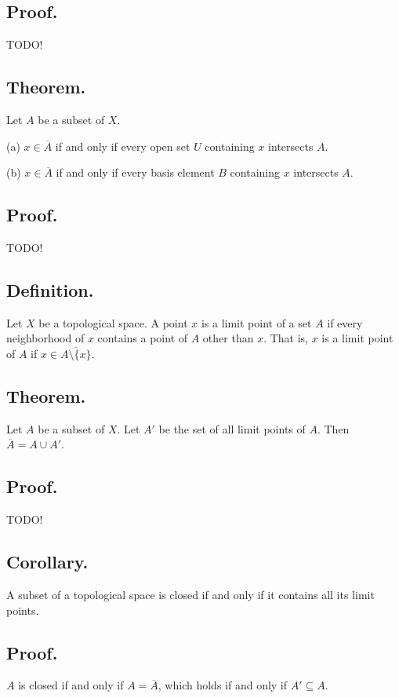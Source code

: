 \documentclass[titlepage]{article}
\begin{document}
\subsection{Proof.} TODO!

\subsection{Theorem.} Let $A$ be a subset of $X$.

(a) $x \in \overline{A}$ if and only if every open set $U$ containing $x$ intersects $A$.

(b) $x \in \overline{A}$ if and only if every basis element $B$ containing $x$ intersects $A$.

\subsection{Proof.} TODO!

\subsection{Definition.} Let $X$ be a topological space. A point $x$ is a limit point of a set $A$ if every neighborhood of $x$ contains a point of $A$ other than $x$. That is, $x$ is a limit point of $A$ if $x \in \overline{A \setminus \{x\}}$.

\subsection{Theorem.} Let $A$ be a subset of $X$. Let $A'$ be the set of all limit points of $A$. Then $\overline{A} = A \cup A'$.

\subsection{Proof.} TODO!

\subsection{Corollary.} A subset of a topological space is closed if and only if it contains all its limit points.

\subsection{Proof.} $A$ is closed if and only if $A = \overline{A}$, which holds if and only if $A' \subseteq A$.
\end{document}
